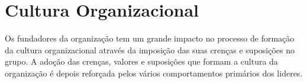 {




\newpage
\section{Cultura Organizacional}
\qquad Os fundadores da organização tem um grande impacto no processo de formação da cultura organizacional através da imposição das suas crenças e suposições no grupo. A adoção das crenças, valores e suposições que formam a cultura da organização é depois reforçada pelos vários comportamentos primários dos lideres.\\

}
